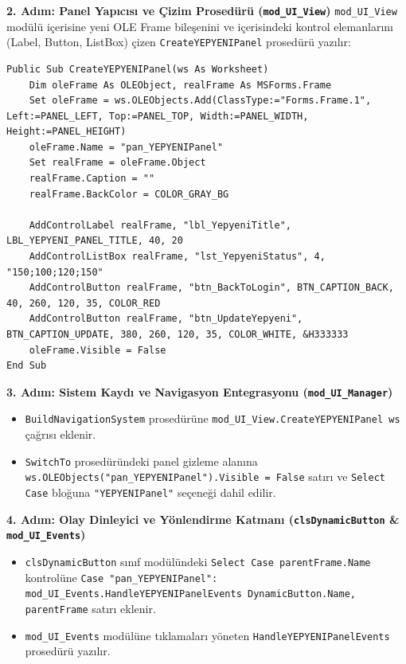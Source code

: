 \textbf{\textcolor{primary}{2. Adım: Panel Yapıcısı ve Çizim Prosedürü (\texttt{mod\_UI\_View})}}
\texttt{mod\_UI\_View} modülü içerisine yeni OLE Frame bileşenini ve içerisindeki kontrol elemanlarını (Label, Button, ListBox) çizen \texttt{CreateYEPYENIPanel} prosedürü yazılır:
\begin{lstlisting}[caption={CreateYEPYENIPanel Çizim Prosedürü}]
Public Sub CreateYEPYENIPanel(ws As Worksheet)
    Dim oleFrame As OLEObject, realFrame As MSForms.Frame
    Set oleFrame = ws.OLEObjects.Add(ClassType:="Forms.Frame.1", Left:=PANEL_LEFT, Top:=PANEL_TOP, Width:=PANEL_WIDTH, Height:=PANEL_HEIGHT)
    oleFrame.Name = "pan_YEPYENIPanel"
    Set realFrame = oleFrame.Object
    realFrame.Caption = ""
    realFrame.BackColor = COLOR_GRAY_BG
    
    AddControlLabel realFrame, "lbl_YepyeniTitle", LBL_YEPYENI_PANEL_TITLE, 40, 20
    AddControlListBox realFrame, "lst_YepyeniStatus", 4, "150;100;120;150"
    AddControlButton realFrame, "btn_BackToLogin", BTN_CAPTION_BACK, 40, 260, 120, 35, COLOR_RED
    AddControlButton realFrame, "btn_UpdateYepyeni", BTN_CAPTION_UPDATE, 380, 260, 120, 35, COLOR_WHITE, &H333333
    oleFrame.Visible = False
End Sub
\end{lstlisting}

\vspace{0.2cm}

\textbf{\textcolor{primary}{3. Adım: Sistem Kaydı ve Navigasyon Entegrasyonu (\texttt{mod\_UI\_Manager})}}
\begin{itemize}\setlength{\itemsep}{2pt}
    \item \texttt{BuildNavigationSystem} prosedürüne \texttt{mod\_UI\_View.CreateYEPYENIPanel ws} çağrısı eklenir.
    \item \texttt{SwitchTo} prosedüründeki panel gizleme alanına \texttt{ws.OLEObjects("pan\_YEPYENIPanel").Visible = False} satırı ve \texttt{Select Case} bloğuna \texttt{"YEPYENIPanel"} seçeneği dahil edilir.
\end{itemize}

\vspace{0.2cm}

\textbf{\textcolor{primary}{4. Adım: Olay Dinleyici ve Yönlendirme Katmanı (\texttt{clsDynamicButton} \& \texttt{mod\_UI\_Events})}}
\begin{itemize}\setlength{\itemsep}{2pt}
    \item \texttt{clsDynamicButton} sınıf modülündeki \texttt{Select Case parentFrame.Name} kontrolüne \texttt{Case "pan\_YEPYENIPanel": mod\_UI\_Events.HandleYEPYENIPanelEvents DynamicButton.Name, parentFrame} satırı eklenir.
    \item \texttt{mod\_UI\_Events} modülüne tıklamaları yöneten \texttt{HandleYEPYENIPanelEvents} prosedürü yazılır.
\end{itemize}

